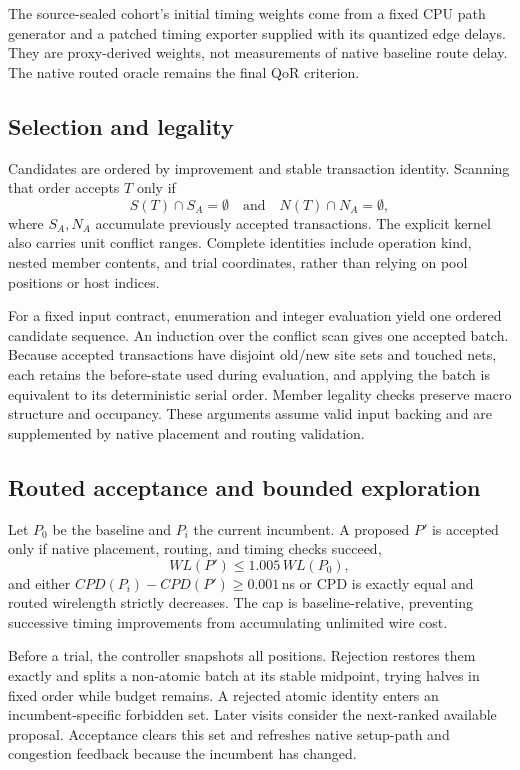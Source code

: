 \documentclass[conference,10pt]{IEEEtran}
\begin{document}
The source-sealed cohort's initial timing weights come from a fixed CPU path
generator and a patched timing exporter supplied with its quantized edge
delays. They are proxy-derived weights, not measurements of native baseline
route delay. The native routed oracle remains the final QoR criterion.

\subsection{Selection and legality}

Candidates are ordered by improvement and stable transaction identity.
Scanning that order accepts $T$ only if
\begin{equation}
S(T)\cap S_A=\emptyset\quad\text{and}\quad N(T)\cap N_A=\emptyset,
\end{equation}
where $S_A,N_A$ accumulate previously accepted transactions. The explicit
kernel also carries unit conflict ranges. Complete identities include
operation kind, nested member contents, and trial coordinates, rather than
relying on pool positions or host indices.

For a fixed input contract, enumeration and integer evaluation yield one
ordered candidate sequence. An induction over the conflict scan gives one
accepted batch. Because accepted transactions have disjoint old/new site
sets and touched nets, each retains the before-state used during evaluation,
and applying the batch is equivalent to its deterministic serial order.
Member legality checks preserve macro structure and occupancy. These
arguments assume valid input backing and are supplemented by native
placement and routing validation.

\subsection{Routed acceptance and bounded exploration}

Let $P_0$ be the baseline and $P_i$ the current incumbent. A proposed $P'$ is
accepted only if native placement, routing, and timing checks succeed,
\begin{equation}
WL(P')\le1.005\,WL(P_0),
\end{equation}
and either $CPD(P_i)-CPD(P')\ge0.001$\,ns or CPD is exactly equal and routed
wirelength strictly decreases. The cap is baseline-relative, preventing
successive timing improvements from accumulating unlimited wire cost.

Before a trial, the controller snapshots all positions. Rejection restores
them exactly and splits a non-atomic batch at its stable midpoint, trying
halves in fixed order while budget remains. A rejected atomic identity enters
an incumbent-specific forbidden set. Later visits consider the next-ranked
available proposal. Acceptance clears this set and refreshes native setup-path
and congestion feedback because the incumbent has changed.
\end{document}
